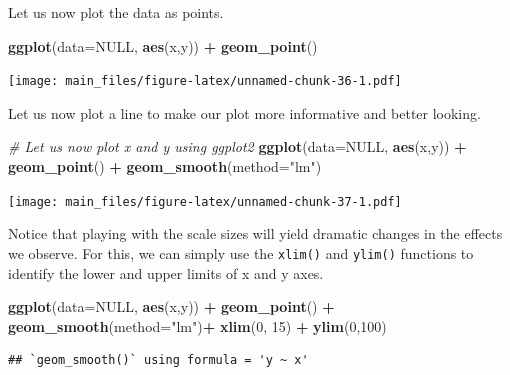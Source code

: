 \documentclass[
]{book}
\newenvironment{Shaded}{\begin{snugshade}}{\end{snugshade}}
\newcommand{\AttributeTok}[1]{\textcolor[rgb]{0.13,0.29,0.53}{#1}}
\newcommand{\CommentTok}[1]{\textcolor[rgb]{0.56,0.35,0.01}{\textit{#1}}}
\newcommand{\ConstantTok}[1]{\textcolor[rgb]{0.56,0.35,0.01}{#1}}
\newcommand{\DecValTok}[1]{\textcolor[rgb]{0.00,0.00,0.81}{#1}}
\newcommand{\FunctionTok}[1]{\textcolor[rgb]{0.13,0.29,0.53}{\textbf{#1}}}
\newcommand{\NormalTok}[1]{#1}
\newcommand{\SpecialCharTok}[1]{\textcolor[rgb]{0.81,0.36,0.00}{\textbf{#1}}}
\newcommand{\StringTok}[1]{\textcolor[rgb]{0.31,0.60,0.02}{#1}}
\begin{document}
Let us now plot the data as points.

\begin{Shaded}
\begin{Highlighting}[]
\FunctionTok{ggplot}\NormalTok{(}\AttributeTok{data=}\ConstantTok{NULL}\NormalTok{, }\FunctionTok{aes}\NormalTok{(x,y)) }\SpecialCharTok{+}
  \FunctionTok{geom\_point}\NormalTok{()}
\end{Highlighting}
\end{Shaded}

\texttt{[image: main\_files/figure-latex/unnamed-chunk-36-1.pdf]}

Let us now plot a line to make our plot more informative and better looking.

\begin{Shaded}
\begin{Highlighting}[]
\CommentTok{\# Let us now plot x and y using ggplot2}
\FunctionTok{ggplot}\NormalTok{(}\AttributeTok{data=}\ConstantTok{NULL}\NormalTok{, }\FunctionTok{aes}\NormalTok{(x,y)) }\SpecialCharTok{+}
  \FunctionTok{geom\_point}\NormalTok{() }\SpecialCharTok{+}
  \FunctionTok{geom\_smooth}\NormalTok{(}\AttributeTok{method=}\StringTok{"lm"}\NormalTok{)}
\end{Highlighting}
\end{Shaded}

\texttt{[image: main\_files/figure-latex/unnamed-chunk-37-1.pdf]}

Notice that playing with the scale sizes will yield dramatic changes in the effects we observe. For this, we can simply use the \texttt{xlim()} and \texttt{ylim()} functions to identify the lower and upper limits of x and y axes.

\begin{Shaded}
\begin{Highlighting}[]
\FunctionTok{ggplot}\NormalTok{(}\AttributeTok{data=}\ConstantTok{NULL}\NormalTok{, }\FunctionTok{aes}\NormalTok{(x,y)) }\SpecialCharTok{+}
  \FunctionTok{geom\_point}\NormalTok{() }\SpecialCharTok{+}
  \FunctionTok{geom\_smooth}\NormalTok{(}\AttributeTok{method=}\StringTok{"lm"}\NormalTok{)}\SpecialCharTok{+}
  \FunctionTok{xlim}\NormalTok{(}\DecValTok{0}\NormalTok{, }\DecValTok{15}\NormalTok{) }\SpecialCharTok{+}
  \FunctionTok{ylim}\NormalTok{(}\DecValTok{0}\NormalTok{,}\DecValTok{100}\NormalTok{)}
\end{Highlighting}
\end{Shaded}

\begin{verbatim}
## `geom_smooth()` using formula = 'y ~ x'
\end{verbatim}
\end{document}
